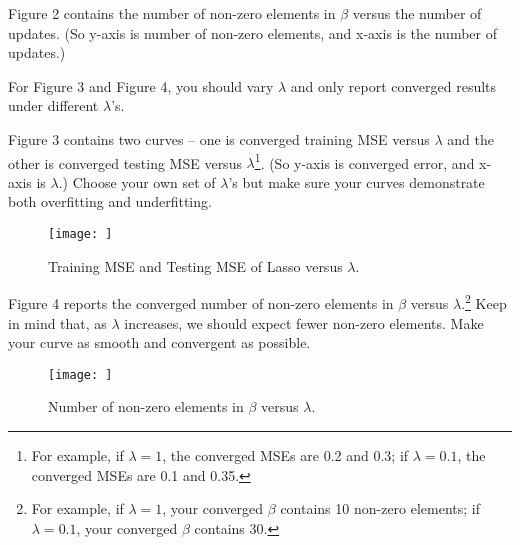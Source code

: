 \documentclass{llncs}
\begin{document}
Figure 2 contains the number of non-zero elements 
in $\beta$ versus the number of updates. (So y-axis 
is number of non-zero elements, and x-axis is the 
number of updates.) 

For Figure 3 and Figure 4, you should vary $\lambda$ 
and only report converged results under different 
$\lambda$'s. 

Figure 3 contains two curves -- one 
is converged training MSE versus $\lambda$ and 
the other is converged testing MSE versus 
$\lambda$\footnote{For example, if $\lambda = 1$, 
the converged MSEs are 0.2 and 0.3; 
if $\lambda = 0.1$, the converged MSEs are 0.1 
and 0.35.}. (So y-axis is converged error, and 
x-axis is $\lambda$.) 
Choose your own set of $\lambda$'s but 
make sure your curves demonstrate both 
overfitting and underfitting. 

\begin{figure}[h!] 
\centering 
\texttt{[image: ]} 
\caption{Training MSE and Testing MSE of 
Lasso versus $\lambda$.} 
\end{figure}

Figure 4 reports the converged number of 
non-zero elements in $\beta$ versus 
$\lambda$.\footnote{For example, if $\lambda=1$, 
your converged $\beta$ contains 10 non-zero 
elements; if $\lambda = 0.1$, your converged 
$\beta$ contains 30.} 
Keep in mind that, as $\lambda$ increases, 
we should expect fewer non-zero elements. 
Make your curve as smooth and convergent 
as possible. 

\begin{figure}[h!] 
\centering 
\texttt{[image: ]} 
\caption{Number of non-zero elements in 
$\beta$ versus $\lambda$.} 
\end{figure}
\end{document}
